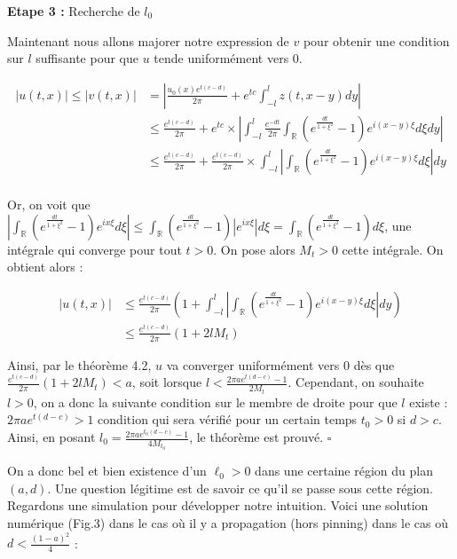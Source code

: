 \documentclass{article}
\begin{document}
\noindent \textbf{Etape 3 :} Recherche de $l_0$

Maintenant nous allons majorer notre expression de $v$ pour obtenir une condition sur $l$ suffisante pour que $u$ tende uniformément vers $0$.


\begin{equation*}
\begin{split}
   |u(t,x)| \le |v(t,x)| & = |\frac{u_0(x)e^{t(c-d)}}{2\pi} + e^{tc}\int_{-l}^l z(t,x-y)dy|\\
   & \le \frac{e^{t(c-d)}}{2\pi} + e^{tc} \times|\int_{-l}^l \frac{e^{-dt}}{2\pi} \int_{\mathbb{R}}(e^{\frac{dt}{1+\xi^2}}-1) e^{i(x-y) \xi} d\xi dy| \\
   & \le \frac{e^{t(c-d)}}{2\pi}+ \frac{e^{t(c-d)}}{2\pi} \times\int_{-l}^l |\int_{\mathbb{R}}(e^{\frac{dt}{1+\xi^2}}-1) e^{i(x-y) \xi} d\xi |dy \\
\end{split}
\end{equation*}

Or, on voit que $ |\int_{\mathbb{R}}(e^{\frac{dt}{1+\xi^2}}-1) e^{ix \xi} d\xi | \le \int_{\mathbb{R}}(e^{\frac{dt}{1+\xi^2}}-1) |e^{ix \xi}| d\xi =\int_{\mathbb{R}}(e^{\frac{dt}{1+\xi^2}}-1)d\xi $, une intégrale qui converge pour tout $t>0$. On pose alors $M_t>0$ cette intégrale. On obtient alors : 

\begin{equation*}
\begin{split}
|u(t,x)| & \le \frac{e^{t(c-d)}}{2\pi}(1+\int_{-l}^l |\int_{\mathbb{R}}(e^{\frac{dt}{1+\xi^2}}-1) e^{i(x-y) \xi} d\xi |dy) \\
& \le \frac{e^{t(c-d)}}{2\pi}(1+2lM_t)
\end{split}
\end{equation*}

Ainsi, par le théorème 4.2, $u$ va converger uniformément vers 0 dès que $\frac{e^{t(c-d)}}{2\pi}(1+2lM_t) <a$, soit lorsque $l < \frac{2\pi a e^{t(d-c)}-1}{2M_t}$. Cependant, on souhaite $l>0$, on a donc la suivante condition sur le membre de droite pour que $l$ existe : $2\pi a e^{t(d-c)}>1$ condition qui sera vérifié pour un certain temps $t_0>0$ si $d>c$. Ainsi, en posant $l_0 =  \frac{2\pi a e^{t_0(d-c)}-1}{4M_{t_0}}$, le théorème est prouvé. $\square$ \newline 


On a donc bel et bien existence d'un $\ell_0>0$ dans une certaine région du plan $(a,d)$. Une question légitime est de savoir ce qu'il se passe sous cette région. Regardons une simulation pour développer notre intuition. Voici une solution numérique (Fig.3) dans le cas où il y a propagation (hors pinning) dans le cas où $d<\frac{(1-a)^2}{4}$ :  
\end{document}
